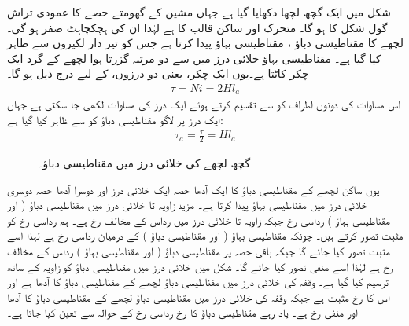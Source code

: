 شکل   میں ایک  گچھ لچھا  دکھایا گیا ہے جہاں مشین کے گھومتے حصے کا عمودی تراش گول شکل کا  ہو گا۔ متحرک اور ساکن  قالب  کا  ہے لہٰذا ان کی ہچکچاہٹ صفر ہو گی۔لچھے کا مقناطیسی دباؤ ،  مقناطیسی بہاؤ  پیدا کرتا  ہے جس کو تیر دار  لکیروں سے ظاہر کیا گیا ہے۔ مقناطیسی بہاؤ خلائی درز میں سے دو مرتبہ گزرتا ہوا لچھے کے گرد ایک چکر کاٹتا ہے۔یوں  ایک چکر، یعنی دو درزوں،  کے لیے درج ذیل ہو گا۔
\begin{align}
\tau=N i=2 H l_a
\end{align}
اس مساوات کی دونوں اطراف کو  سے تقسیم کرتے ہوئے  ایک درز کی مساوات لکھی جا سکتی ہے جہاں ایک درز پر لاگو مقناطیسی دباؤ کو   سے ظاہر کیا گیا ہے:
\begin{align*}
\tau_a=\frac{\tau}{2}=H l_a
\end{align*}
%
\begin{figure}
\centering
\caption{گچھ لچھے کی خلائی درز میں مقناطیسی دباؤ۔}
\label{شکل_گھومتے_مشین_گچھ_لچھے_کا_دباو}
\end{figure}%

یوں ساکن لچھے کے مقناطیسی دباؤ  کا  ایک آدھا حصہ  ایک خلائی درز اور دوسرا آدھا حصہ  دوسری خلائی درز میں مقناطیسی بہاؤ پیدا کرتا ہے۔ مزید  زاویہ  تا   خلائی درز میں مقناطیسی دباؤ ( اور  مقناطیسی بہاؤ )  رداسی رخ  جبکہ زاویہ  تا   خلائی درز میں  رداس کے مخالف رخ ہے۔ ہم رداسی رخ  کو مثبت تصور کرتے ہیں۔ چونکہ مقناطیسی بہاؤ ( اور مقناطیسی دباؤ )  کے درمیان رداسی رخ ہے لہٰذا اسے مثبت تصور کیا جائے گا جبکہ باقی حصہ پر مقناطیسی دباؤ ( اور مقناطیسی بہاؤ ) رداس کے مخالف رخ ہے لہٰذا  اسے منفی تصور کیا جائے گا۔  شکل  میں خلائی درز میں مقناطیسی دباؤ کو زاویہ کے ساتھ ترسیم کیا گیا ہے۔ وقفہ  کی خلائی درز میں مقناطیسی دباؤ  لچھے کے مقناطیسی دباؤ  کا آدھا ہے اور اس کا رخ مثبت ہے جبکہ وقفہ  کی خلائی درز میں مقناطیسی دباؤ لچھے کے مقناطیسی دباؤ کا آدھا  اور منفی رخ  ہے۔ یاد رہے مقناطیسی دباؤ کا رخ  رداسی رخ کے حوالہ  سے تعین کیا جاتا ہے۔


